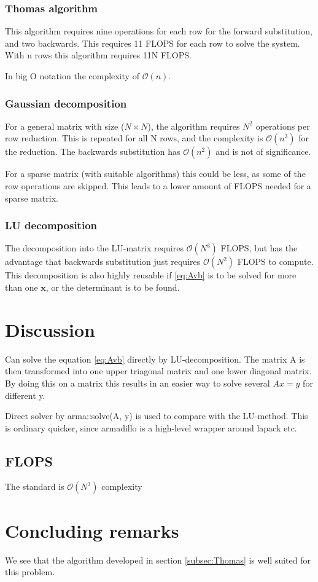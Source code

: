 \documentclass[11pt,a4paper,english,final]{article}
\numberwithin{equation}{section}
\newcommand{\ve}[1]{\mathbf{#1}} %
\newcommand{\bigO}[1]{\mathcal{O}\left( #1 \right)}
\begin{document}
\subsubsection{Thomas algorithm}
This algorithm requires nine operations for each row for the forward substitution,
and two backwards. This requires 11 FLOPS for each row to solve the system.
With n rows this algorithm requires 11N FLOPS.

In big O notation the complexity of $\bigO{n}$.

\subsubsection{Gaussian decomposition}
For a general matrix with size ($N\times N$), the algorithm requires
$N^2$ operations per row reduction. This is repeated for all N rows,
and the complexity is $\bigO{n^3}$ for the reduction. The backwards 
substitution has $\bigO{n^2}$ and is not of significance.

For a sparse matrix (with suitable algorithms) this could be less, 
as some of the row operations are
skipped. This leads to a lower amount of FLOPS needed for a sparse
matrix.

\subsubsection{LU decomposition}
The decomposition into the LU-matrix requires $\bigO{N^3}$ FLOPS, but 
has the advantage that backwards substitution just requires $\bigO{N^2}$
FLOPS to compute. This decomposition is also highly reusable if \eqref{eq:Avb}
is to be solved for more than one $\ve{x}$, or the determinant is to be found.

\section{Discussion}

Can solve the equation \eqref{eq:Avb} directly by LU-decomposition.
The matrix A is then transformed into one upper triagonal matrix and
one lower diagonal matrix. By doing this on a matrix this results in an
easier way to solve several $Ax = y$ for different y.

Direct solver by arma::solve(A, y) is used to compare with the LU-method.
This is ordinary quicker, since armadillo is a high-level wrapper around
lapack etc.

\subsection{FLOPS}
The standard is $\bigO{N^3}$ complexity

\section{Concluding remarks}


We see that the algorithm developed in section \ref{subsec:Thomas} is 
well suited for this problem.
\end{document}
